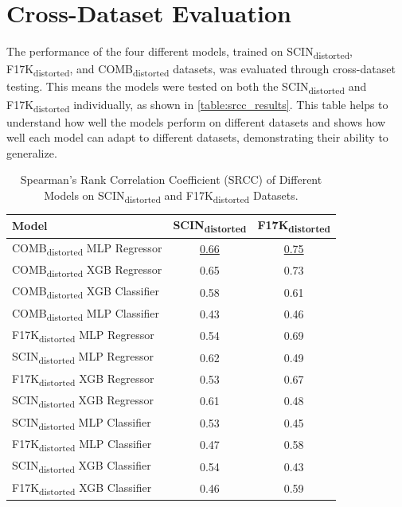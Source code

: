 \clearpage
\section{Cross-Dataset Evaluation}
\label{sec:CrossData}
The performance of the four different models, trained on SCIN\textsubscript{distorted}, F17K\textsubscript{distorted}, and COMB\textsubscript{distorted} datasets, was evaluated through cross-dataset testing. This means the models were tested on both the SCIN\textsubscript{distorted} and F17K\textsubscript{distorted} individually, as shown in \autoref{table:srcc_results}. This table helps to understand how well the models perform on different datasets and shows how well each model can adapt to different datasets, demonstrating their ability to generalize. \par 
 \begin{table}[ht]
    \centering
    \begin{tabular}{|l|c|c|}
        \hline
        \textbf{Model} & \textbf{SCIN\textsubscript{distorted}} & \textbf{F17K\textsubscript{distorted}} \\
        \hline
        COMB\textsubscript{distorted} MLP Regressor & \underline{0.66} & \underline{0.75} \\
        COMB\textsubscript{distorted} XGB Regressor & 0.65 & 0.73 \\
        COMB\textsubscript{distorted} XGB Classifier & 0.58 & 0.61 \\
        COMB\textsubscript{distorted} MLP Classifier & 0.43 & 0.46 \\
        \hline
        F17K\textsubscript{distorted} MLP Regressor & 0.54 & 0.69 \\
        SCIN\textsubscript{distorted} MLP Regressor & 0.62 & 0.49 \\
        F17K\textsubscript{distorted} XGB Regressor & 0.53 & 0.67 \\
        SCIN\textsubscript{distorted} XGB Regressor & 0.61 & 0.48 \\
        SCIN\textsubscript{distorted} MLP Classifier & 0.53 & 0.45 \\
        F17K\textsubscript{distorted} MLP Classifier & 0.47 & 0.58 \\
        SCIN\textsubscript{distorted} XGB Classifier & 0.54 & 0.43 \\
        F17K\textsubscript{distorted} XGB Classifier & 0.46 & 0.59 \\
        \hline
    \end{tabular}
    \caption{Spearman’s Rank Correlation Coefficient (SRCC) of Different Models on SCIN\textsubscript{distorted} and F17K\textsubscript{distorted} Datasets.}
    \label{table:srcc_results}
\end{table}


